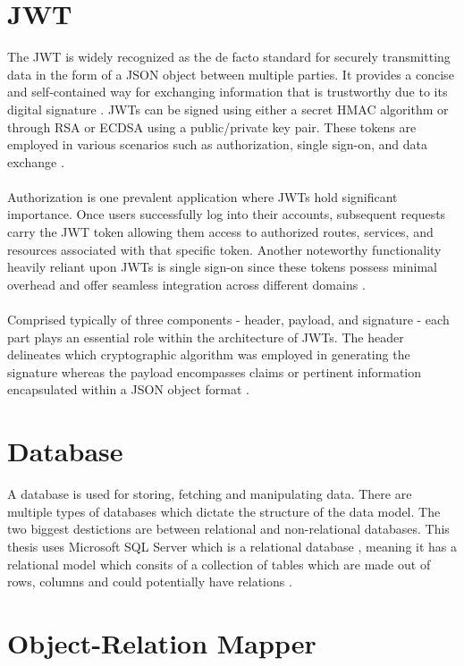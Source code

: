 \documentclass[BIF,Bachelor,nenglish]{twbook}%
\begin{document}
\section{\ac{JWT}}
The \ac{JWT} is widely recognized as the de facto standard for securely transmitting data in the form of a JSON object between multiple parties. It provides a concise and self-contained way for exchanging information that is trustworthy due to its digital signature \cite{akanajwt}. \ac{JWT}s can be signed using either a secret HMAC algorithm or through RSA or ECDSA using a public/private key pair. These tokens are employed in various scenarios such as authorization, single sign-on, and data exchange \cite{oauthjwt}.
\\
\\
Authorization is one prevalent application where \ac{JWT}s hold significant importance. Once users successfully log into their accounts, subsequent requests carry the \ac{JWT} token allowing them access to authorized routes, services, and resources associated with that specific token. Another noteworthy functionality heavily reliant upon \ac{JWT}s is single sign-on since these tokens possess minimal overhead and offer seamless integration across different domains \cite{jwt, oauthjwt}.
\\
\\
Comprised typically of three components - header, payload, and signature - each part plays an essential role within the architecture of \ac{JWT}s. The header delineates which cryptographic algorithm was employed in generating the signature whereas the payload encompasses claims or pertinent information encapsulated within a JSON object format \cite{superjwt}.

\section{Database}
A database is used for storing, fetching and manipulating data. There are multiple types of databases which dictate the structure of the data model. The two biggest destictions are between relational and non-relational databases. This thesis uses Microsoft SQL Server which is a relational database \cite{whatmsSQLdb}, meaning it has a relational model which consits of a collection of tables which are made out of rows, columns and could potentially have relations \cite{oraclereldb, ibmreldb}.

\section{Object-Relation Mapper}
\end{document}
